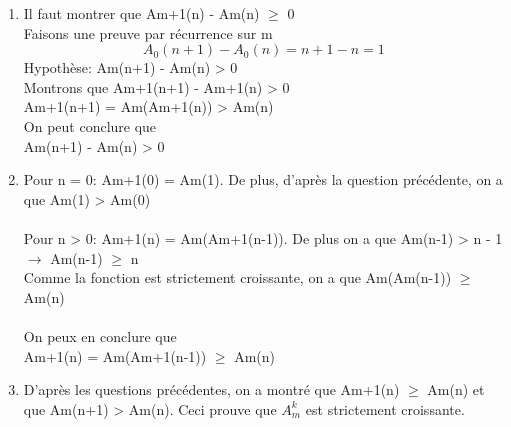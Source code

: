 \documentclass[]{article}
\begin{document}
\begin{enumerate}
\begin{enumerate}
\item  Il faut montrer que A\tiny m+1\normalsize (n) - A\tiny m\normalsize (n)  $\ge$ 0\\
Faisons une preuve par récurrence sur m \\
\[A_0(n+1) - A_0(n) = n + 1 - n = 1\] 
Hypothèse: A\tiny m\normalsize (n+1) - A\tiny m\normalsize (n) > 0\\
Montrons que A\tiny m+1\normalsize (n+1) - A\tiny m+1\normalsize (n) > 0\\
A\tiny m+1\normalsize (n+1) = A\tiny m\normalsize (A\tiny m+1\normalsize (n)) > A\tiny m\normalsize (n)\\
On peut conclure que\\ 
A\tiny m\normalsize (n+1) - A\tiny m\normalsize (n) > 0

\item 
Pour n = 0: A\tiny m+1\normalsize (0) = A\tiny m\normalsize (1). De plus, d'après la question précédente, on a que A\tiny m\normalsize (1) > A\tiny m\normalsize (0)\\\\
Pour n > 0: A\tiny m+1\normalsize (n) = A\tiny m\normalsize (A\tiny m+1\normalsize (n-1)). De plus on a que A\tiny m\normalsize (n-1) > n - 1 $\rightarrow$ A\tiny m\normalsize (n-1) $\ge$ n\\
Comme la fonction est strictement croissante, on a que  A\tiny m\normalsize (A\tiny m\normalsize (n-1)) $\ge$ A\tiny m\normalsize (n) \\ \\
On peux en conclure que \\
A\tiny m+1\normalsize (n) = A\tiny m\normalsize (A\tiny m+1\normalsize (n-1)) $\ge$ A\tiny m\normalsize (n) 

\item D'après les questions précédentes, on a montré que A\tiny m+1\normalsize (n) $\ge$ A\tiny m\normalsize (n) et que A\tiny m\normalsize (n+1) > A\tiny m\normalsize (n). Ceci prouve que $A_m^k$ est strictement croissante. 


\end{enumerate}
\end{enumerate}
\end{document}
